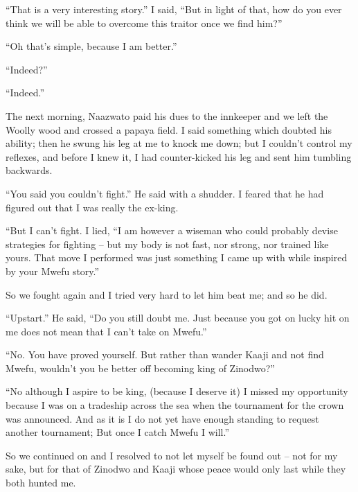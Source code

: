 ``That is a very interesting story.'' I said, ``But in light of that, how do you ever think we will be able to overcome this traitor once we find him?''

``Oh that's simple, because I am better.''

``Indeed?''

``Indeed.''

\tbreak

The next morning, Naazwato paid his dues to the innkeeper and we left the Woolly wood and crossed a papaya field. I said something which doubted his ability; then he swung his leg at me to knock me down; but I couldn't control my reflexes, and before I knew it, I had counter-kicked his leg and sent him tumbling backwards.

``You said you couldn't fight.'' He said with a shudder. I feared that he had figured out that I was really the ex-king.

``But I can't fight. I lied, ``I am however a wiseman who could probably devise strategies for fighting -- but my body is not fast, nor strong, nor trained like yours. That move I performed was just something I came up with while inspired by your Mwefu story.''

So we fought again and I tried very hard to let him beat me; and so he did.

``Upstart.'' He said, ``Do you still doubt me. Just because you got on lucky hit on me does not mean that I can't take on Mwefu.''

``No. You have proved yourself. But rather than wander Kaaji and not find Mwefu, wouldn't you be better off becoming king of Zinodwo?''

``No although I aspire to be king, (because I deserve it) I missed my opportunity because I was on a tradeship across the sea when the tournament for the crown was announced. And as it is I do not yet have enough standing to request another tournament; But once I catch Mwefu I will.''

So we continued on and I resolved to not let myself be found out -- not for my sake, but for that of Zinodwo and Kaaji whose peace would only last while they both hunted me.
